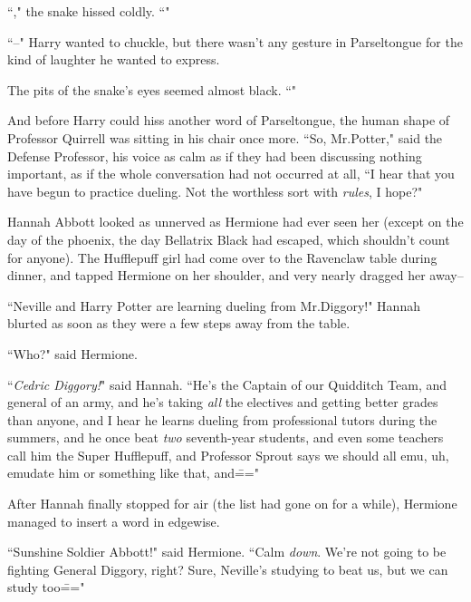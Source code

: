 ``," the snake hissed coldly. ``"

``\---" Harry wanted to chuckle, but there wasn't any gesture in Parseltongue for the kind of laughter he wanted to express.

The pits of the snake's eyes seemed almost black. ``"

And before Harry could hiss another word of Parseltongue, the human shape of Professor Quirrell was sitting in his chair once more. ``So, Mr.\?Potter," said the Defense Professor, his voice as calm as if they had been discussing nothing important, as if the whole conversation had not occurred at all, ``I hear that you have begun to practice dueling. Not the worthless sort with \emph{rules}, I hope?"

\later

Hannah Abbott looked as unnerved as Hermione had ever seen her (except on the day of the phoenix, the day Bellatrix Black had escaped, which shouldn't count for anyone). The Hufflepuff girl had come over to the Ravenclaw table during dinner, and tapped Hermione on her shoulder, and very nearly dragged her away\---

``Neville and Harry Potter are learning dueling from Mr.\?Diggory!" Hannah blurted as soon as they were a few steps away from the table.

``Who?" said Hermione.

``\emph{Cedric Diggory!}" said Hannah. ``He's the Captain of our Quidditch Team, and general of an army, and he's taking \emph{all} the electives and getting better grades than anyone, and I hear he learns dueling from professional tutors during the summers, and he once beat \emph{two} seventh-year students, and even some teachers call him the Super Hufflepuff, and Professor Sprout says we should all emu, uh, emudate him or something like that, and\==="

After Hannah finally stopped for air (the list had gone on for a while), Hermione managed to insert a word in edgewise.

``Sunshine Soldier Abbott!" said Hermione. ``Calm \emph{down}. We're not going to be fighting General Diggory, right? Sure, Neville's studying to beat us, but we can study too\==="


